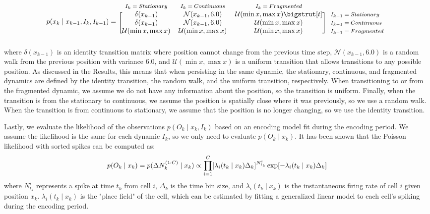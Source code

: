 \documentclass[times, twoside]{zHenriquesLab-StyleBioRxiv}
\begin{document}
\begin{equation*}
  p(x_{k} \mid x_{k-1}, I_{k}, I_{k-1}) = 
  \begin{blockarray}{*{3}{c} l}
    \begin{block}{*{3}{>{$\footnotesize}c<{$}} l}
      $I_{k} = Stationary$ & $I_{k} = Continuous$ & $I_{k} = Fragmented$ \\
    \end{block}
    \begin{block}{[*{3}{c}]>{$\footnotesize}l<{$}}
      \delta(x_{k-1}) & \mathcal{N}(x_{k-1}, 6.0) & \mathcal{U}(\min x, \max x) \bigstrut[t]& $I_{k-1} = Stationary$ \\
      \delta(x_{k-1}) & \mathcal{N}(x_{k-1}, 6.0)  & \mathcal{U}(\min x, \max x) & $I_{k-1} = Continuous$ \\
      \mathcal{U}(\min x, \max x) & \mathcal{U}(\min x, \max x) & \mathcal{U}(\min x, \max x) & $I_{k-1} = Fragmented$ \\
    \end{block}
  \end{blockarray}
\end{equation*}
where $\delta(x_{k-1})$ is an identity transition matrix where position cannot change from the previous time step, $\mathcal{N}(x_{k-1}, 6.0)$ is a random walk from the previous position with variance 6.0, and $\mathcal{U}(\min x, \max x)$ is a uniform transition that allows transitions to any possible position. As discussed in the Results, this means that when persisting in the same dynamic, the stationary, continuous, and fragmented dynamics are defined by the identity transition, the random walk, and the uniform transition, respectively. When transitioning to or from the fragmented dynamic, we assume we do not have any information about the position, so the transition is uniform. Finally, when the transition is from the stationary to continuous, we assume the position is spatially close where it was previously, so we use a random walk. When the transition is from continuous to stationary, we assume that the position is no longer changing, so we use the identity transition.

Lastly, we evaluate the likelihood of the observations $p(O_{k} \mid x_{k}, I_{k})$ based on an encoding model fit during the encoding period. We assume the likelihood is the same for each dynamic $I_k$, so we only need to evaluate $p(O_{k} \mid x_{k})$. It has been shown \cite{ZhangInterpretingNeuronalPopulation1998, BrownStatisticalParadigmNeural1998} that the Poisson likelihood with sorted spikes can be computed as:
$$
p(O_{k} \mid x_{k}) = p(\Delta N_{k}^{(1:C)} \mid x_{k}) \propto
\prod^{C}_{i=1} [\lambda_{i}(t_{k} \mid x_{k})\Delta_{k}]^{N_{t_{k}}^{i}} \\
    \exp[-\lambda_{i}(t_{k} \mid x_{k})\Delta_{k}]
$$
where $N_{t_{k}}^{i}$ represents a spike at time $t_k$ from cell $i$, $\Delta_k$ is the time bin size, and $\lambda_{i}(t_{k} \mid x_{k})$ is the instantaneous firing rate of cell $i$ given position $x_{k}$. $\lambda_{i}(t_{k} \mid x_{k})$ is the "place field" of the cell, which can be estimated by fitting a generalized linear model to each cell's spiking during the encoding period.
\end{document}
